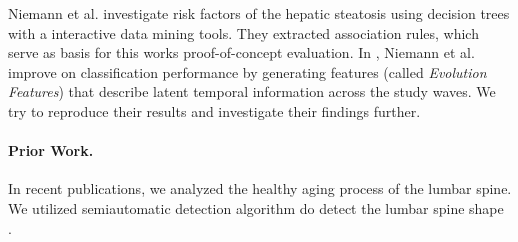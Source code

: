\documentclass[journal]{style/vgtc} 			          %
\newcommand{\com}[1]{\textcolor{orange}{\uline{#1}}}
\begin{document}
Niemann et al. \cite{Niemann2014} investigate risk factors of the hepatic steatosis using decision trees with a interactive data mining tools.
They extracted association rules, which serve as basis for this works proof-of-concept evaluation.
In \cite{Niemann2015}, Niemann et al. improve on classification performance by generating features (called \emph{Evolution Features}) that describe latent temporal information across the study waves.
We try to reproduce their results and investigate their findings further.

\paragraph{Prior Work.}
In recent publications, we analyzed the healthy aging process of the lumbar spine.
We utilized semiautomatic detection algorithm do detect the lumbar spine shape \cite{Klemm2013VMV}.
\end{document}
